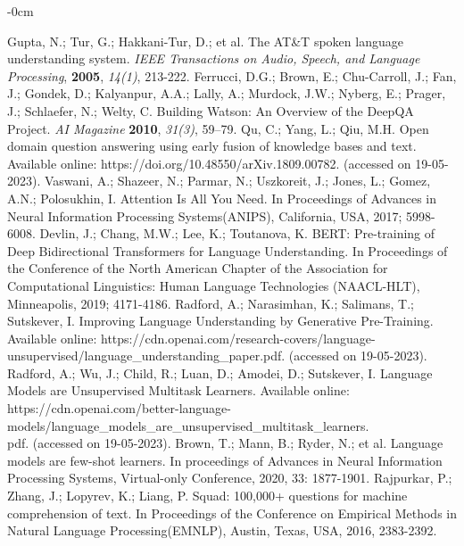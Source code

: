 \documentclass[mathematics,article,submit,moreauthors]{Definitions/mdpi}
\newcommand{\1}[1]{\mathds{1}\left[#1\right]}
\begin{document}
\begin{adjustwidth}{-\extralength}{0cm}
\begin{thebibliography}{999}
	Gupta, N.; Tur, G.; Hakkani-Tur, D.; et al. The AT\&T spoken language understanding system. {\em IEEE Transactions on Audio, Speech, and Language Processing}, {\bf 2005}, {\em 14(1)}, 213-222.
	Ferrucci, D.G.; Brown, E.; Chu-Carroll, J.; Fan, J.; Gondek, D.; Kalyanpur, A.A.; Lally, A.; Murdock, J.W.; Nyberg, E.; Prager, J.; Schlaefer, N.; Welty, C. Building Watson: An Overview of the DeepQA Project. {\em AI Magazine} {\bf 2010}, {\em 31(3)}, 59--79.
	Qu, C.; Yang, L.; Qiu, M.H. Open domain question answering using early fusion of knowledge bases and text. Available online: https://doi.org/10.48550/arXiv.1809.00782. (accessed on 19-05-2023).
	Vaswani, A.; Shazeer, N.; Parmar, N.; Uszkoreit, J.; Jones, L.; Gomez, A.N.; Polosukhin, I. Attention Is All You Need. In Proceedings of Advances in Neural Information Processing Systems(ANIPS), California, USA, 2017; 5998-6008.
	Devlin, J.; Chang, M.W.; Lee, K.; Toutanova, K. BERT: Pre-training of Deep Bidirectional Transformers for Language Understanding. In Proceedings of the Conference of the North American Chapter of the Association for Computational Linguistics: Human Language Technologies (NAACL-HLT), Minneapolis, 2019; 4171-4186.
	Radford, A.; Narasimhan, K.; Salimans, T.; Sutskever, I. Improving Language Understanding by Generative Pre-Training. Available online: https://cdn.openai.com/research-covers/language-unsupervised/language\_understanding\_paper.pdf. (accessed on 19-05-2023).
	Radford, A.; Wu, J.; Child, R.; Luan, D.; Amodei, D.; Sutskever, I. Language Models are Unsupervised Multitask Learners. Available online: https://cdn.openai.com/better-language-models/language\_models\_are\_unsupervised\_multitask\_learners.\\pdf. (accessed on 19-05-2023).
	Brown, T.; Mann, B.; Ryder, N.; et al. Language models are few-shot learners. In proceedings of Advances in Neural Information Processing Systems, Virtual-only Conference, 2020, 33: 1877-1901.
	Rajpurkar, P.; Zhang, J.; Lopyrev, K.; Liang, P. Squad: 100,000+ questions for machine comprehension of text. In Proceedings of the Conference on Empirical Methods in Natural Language Processing(EMNLP), Austin, Texas, USA, 2016, 2383-2392.

\end{thebibliography}
\end{adjustwidth}
\end{document}
